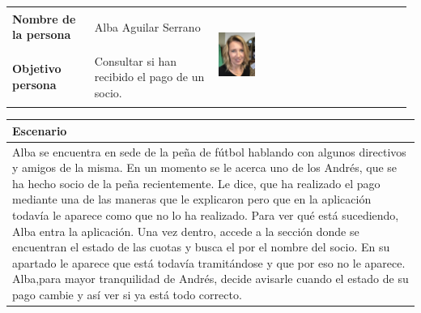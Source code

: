\documentclass[11pt]{article}
\begin{document}
\begin{table}[H]
	\centering
	\begin{tabular}{p{0.2\linewidth}|p{0.3\linewidth}p{0.475\linewidth}}
		\toprule
		\textbf{Nombre de la persona} & Alba Aguilar Serrano &\multirow{2}{*}{\begin{minipage}{1.\textwidth}\includegraphics[width=0.2\textwidth, height=30mm]{Alba}\end{minipage}}\\
		\textbf{Objetivo persona} & Consultar si han recibido el pago de un socio.  \\
		\bottomrule
	\end{tabular}
	
	\begin{tabular}{p{1.028\linewidth}}
		\textbf{Escenario}\\
		\midrule
		Alba se encuentra en sede de la peña de fútbol hablando con algunos directivos y amigos de la misma. En un momento se le acerca uno de los Andrés, que se ha hecho socio de la peña recientemente. Le dice, que ha realizado el pago mediante una de las maneras que le explicaron pero que en la aplicación todavía le aparece como que no lo ha realizado. Para ver qué está sucediendo, Alba entra la aplicación. Una vez dentro, accede a la sección donde se encuentran el estado de las cuotas y busca el por el nombre del socio. En su apartado le aparece que está todavía tramitándose y que por eso no le aparece. Alba,para mayor tranquilidad de Andrés, decide avisarle cuando el estado de su pago cambie y así ver si ya está todo correcto. 
	\end{tabular}
\end{table}
\end{document}
